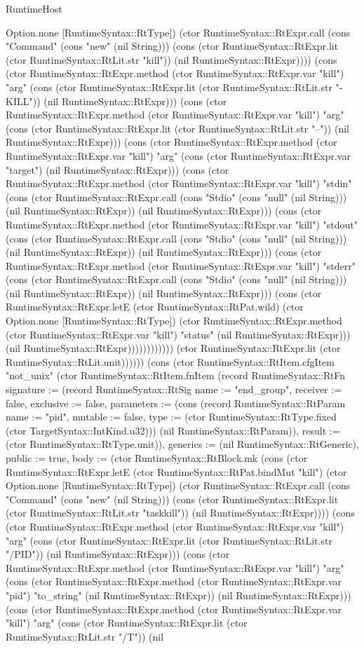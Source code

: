 \begin{lexlean}{RuntimeHost}
\begin{semanticmodule}
{Option.none [RuntimeSyntax::RtType]) (ctor RuntimeSyntax::RtExpr.call (cons "Command" (cons "new" (nil String))) (cons (ctor RuntimeSyntax::RtExpr.lit (ctor RuntimeSyntax::RtLit.str "kill")) (nil RuntimeSyntax::RtExpr)))) (cons (ctor RuntimeSyntax::RtExpr.method (ctor RuntimeSyntax::RtExpr.var "kill") "arg" (cons (ctor RuntimeSyntax::RtExpr.lit (ctor RuntimeSyntax::RtLit.str "-KILL")) (nil RuntimeSyntax::RtExpr))) (cons (ctor RuntimeSyntax::RtExpr.method (ctor RuntimeSyntax::RtExpr.var "kill") "arg" (cons (ctor RuntimeSyntax::RtExpr.lit (ctor RuntimeSyntax::RtLit.str "--")) (nil RuntimeSyntax::RtExpr))) (cons (ctor RuntimeSyntax::RtExpr.method (ctor RuntimeSyntax::RtExpr.var "kill") "arg" (cons (ctor RuntimeSyntax::RtExpr.var "target") (nil RuntimeSyntax::RtExpr))) (cons (ctor RuntimeSyntax::RtExpr.method (ctor RuntimeSyntax::RtExpr.var "kill") "stdin" (cons (ctor RuntimeSyntax::RtExpr.call (cons "Stdio" (cons "null" (nil String))) (nil RuntimeSyntax::RtExpr)) (nil RuntimeSyntax::RtExpr))) (cons (ctor RuntimeSyntax::RtExpr.method (ctor RuntimeSyntax::RtExpr.var "kill") "stdout" (cons (ctor RuntimeSyntax::RtExpr.call (cons "Stdio" (cons "null" (nil String))) (nil RuntimeSyntax::RtExpr)) (nil RuntimeSyntax::RtExpr))) (cons (ctor RuntimeSyntax::RtExpr.method (ctor RuntimeSyntax::RtExpr.var "kill") "stderr" (cons (ctor RuntimeSyntax::RtExpr.call (cons "Stdio" (cons "null" (nil String))) (nil RuntimeSyntax::RtExpr)) (nil RuntimeSyntax::RtExpr))) (cons (ctor RuntimeSyntax::RtExpr.letE (ctor RuntimeSyntax::RtPat.wild) (ctor Option.none [RuntimeSyntax::RtType]) (ctor RuntimeSyntax::RtExpr.method (ctor RuntimeSyntax::RtExpr.var "kill") "status" (nil RuntimeSyntax::RtExpr))) (nil RuntimeSyntax::RtExpr)))))))))))) (ctor RuntimeSyntax::RtExpr.lit (ctor RuntimeSyntax::RtLit.unit)))}))) (cons (ctor RuntimeSyntax::RtItem.cfgItem "not_unix" (ctor RuntimeSyntax::RtItem.fnItem (record RuntimeSyntax::RtFn {signature := (record RuntimeSyntax::RtSig {name := "end_group", receiver := false, exclusive := false, parameters := (cons (record RuntimeSyntax::RtParam {name := "pid", mutable := false, type := (ctor RuntimeSyntax::RtType.fixed (ctor TargetSyntax::IntKind.u32))}) (nil RuntimeSyntax::RtParam)), result := (ctor RuntimeSyntax::RtType.unit)}), generics := (nil RuntimeSyntax::RtGeneric), public := true, body := (ctor RuntimeSyntax::RtBlock.mk (cons (ctor RuntimeSyntax::RtExpr.letE (ctor RuntimeSyntax::RtPat.bindMut "kill") (ctor Option.none [RuntimeSyntax::RtType]) (ctor RuntimeSyntax::RtExpr.call (cons "Command" (cons "new" (nil String))) (cons (ctor RuntimeSyntax::RtExpr.lit (ctor RuntimeSyntax::RtLit.str "taskkill")) (nil RuntimeSyntax::RtExpr)))) (cons (ctor RuntimeSyntax::RtExpr.method (ctor RuntimeSyntax::RtExpr.var "kill") "arg" (cons (ctor RuntimeSyntax::RtExpr.lit (ctor RuntimeSyntax::RtLit.str "/PID")) (nil RuntimeSyntax::RtExpr))) (cons (ctor RuntimeSyntax::RtExpr.method (ctor RuntimeSyntax::RtExpr.var "kill") "arg" (cons (ctor RuntimeSyntax::RtExpr.method (ctor RuntimeSyntax::RtExpr.var "pid") "to_string" (nil RuntimeSyntax::RtExpr)) (nil RuntimeSyntax::RtExpr))) (cons (ctor RuntimeSyntax::RtExpr.method (ctor RuntimeSyntax::RtExpr.var "kill") "arg" (cons (ctor RuntimeSyntax::RtExpr.lit (ctor RuntimeSyntax::RtLit.str "/T")) (nil }
\end{semanticmodule}
\end{lexlean}

